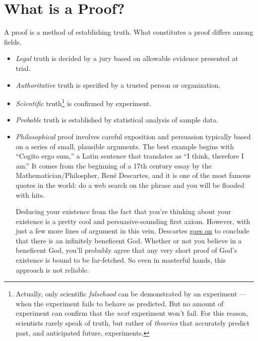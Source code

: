 % 

\chapter{What is a Proof?}

\newcommand{\posints}{\integers^+}

A proof is a method of establishing truth.  What constitutes a proof
differs among fields.

\begin{itemize}

\item \emph{Legal} truth is decided by a jury based on
allowable evidence presented at trial.

\item \emph{Authoritative} truth is specified by a trusted person or
organization.

\item \emph{Scientific} truth\footnote{Actually, only scientific
\emph{falsehood} can be demonstrated by an experiment ---when the experiment
fails to behave as predicted.  But no amount of experiment can confirm
that the \emph{next} experiment won't fail.  For this reason, scientists
rarely speak of truth, but rather of \emph{theories} that accurately
predict past, and anticipated future, experiments.} is confirmed by
experiment.

\item \emph{Probable} truth is established by statistical analysis of
sample data.

\item \emph{Philosophical} proof involves careful exposition and
  persuasion typically based on a series of small, plausible arguments.
  The best example begins with ``Cogito ergo sum,'' a Latin sentence that
  translates as ``I think, therefore I am.''  It comes from the beginning
  of a 17th century essay by the Mathematician/Philospher, Ren\'e
  Descartes, and it is one of the most famous quotes in the world: do a
  web search on the phrase and you will be flooded with hits.

  Deducing your existence from the fact that you're thinking about your
  existence is a pretty cool and persuasive-sounding first axiom.
  However, with just a few more lines of argument in this vein, Descartes
  \href{http://www.btinternet.com/~glynhughes/squashed/descartes.htm}{goes
    on} to conclude that there is an infinitely beneficent God.  Whether
  or not you believe in a beneficent God, you'll probably agree that any
  very short proof of God's existence is bound to be far-fetched.  So even
  in masterful hands, this approach is not reliable.
\end{itemize}

